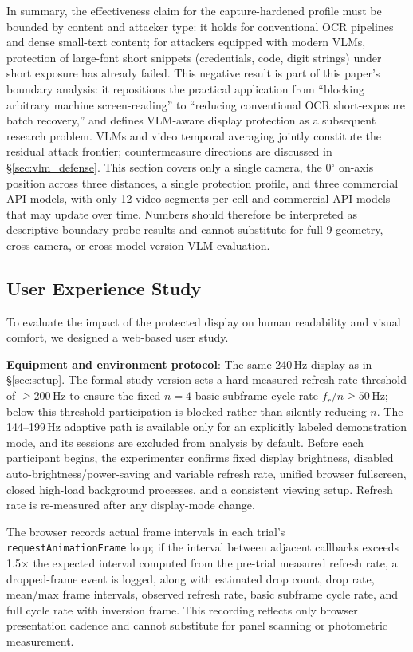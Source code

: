 \documentclass{ieeeaccess}
\begin{document}
In summary, the effectiveness claim for the capture-hardened profile must be bounded by content and attacker type: it holds for conventional OCR pipelines and dense small-text content; for attackers equipped with modern VLMs, protection of large-font short snippets (credentials, code, digit strings) under short exposure has already failed. This negative result is part of this paper's boundary analysis: it repositions the practical application from ``blocking arbitrary machine screen-reading'' to ``reducing conventional OCR short-exposure batch recovery,'' and defines VLM-aware display protection as a subsequent research problem. VLMs and video temporal averaging jointly constitute the residual attack frontier; countermeasure directions are discussed in \S\ref{sec:vlm_defense}. This section covers only a single camera, the 0$^{\circ}$ on-axis position across three distances, a single protection profile, and three commercial API models, with only 12 video segments per cell and commercial API models that may update over time. Numbers should therefore be interpreted as descriptive boundary probe results and cannot substitute for full 9-geometry, cross-camera, or cross-model-version VLM evaluation.

\subsection{User Experience Study}
\label{sec:user_study}

To evaluate the impact of the protected display on human readability and visual comfort, we designed a web-based user study.

\textbf{Equipment and environment protocol}: The same 240\,Hz display as in \S\ref{sec:setup}. The formal study version sets a hard measured refresh-rate threshold of $\geq$200\,Hz to ensure the fixed $n=4$ basic subframe cycle rate $f_r/n\geq50$\,Hz; below this threshold participation is blocked rather than silently reducing $n$. The 144--199\,Hz adaptive path is available only for an explicitly labeled demonstration mode, and its sessions are excluded from analysis by default. Before each participant begins, the experimenter confirms fixed display brightness, disabled auto-brightness/power-saving and variable refresh rate, unified browser fullscreen, closed high-load background processes, and a consistent viewing setup. Refresh rate is re-measured after any display-mode change.

The browser records actual frame intervals in each trial's \texttt{requestAnimationFrame} loop; if the interval between adjacent callbacks exceeds 1.5$\times$ the expected interval computed from the pre-trial measured refresh rate, a dropped-frame event is logged, along with estimated drop count, drop rate, mean/max frame intervals, observed refresh rate, basic subframe cycle rate, and full cycle rate with inversion frame. This recording reflects only browser presentation cadence and cannot substitute for panel scanning or photometric measurement.
\end{document}

